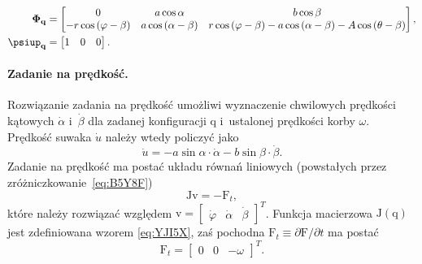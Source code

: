 \documentclass[paper=a4,DIV=12]{tmmlab}
\newcommand{\brm}[1]{\bm{\mathrm{#1}}}
\begin{document}
\begin{appendices}
  \begin{subequations}
    \label{eq:JSBPA}
    \begin{align}
    \brm{\Phi}_{\brm{q}}& = \begin{bmatrix}
      0 &
      a \cos{\alpha} &
      b \cos{\beta}
      \\
     -r \cos{(\varphi - \beta)} &
      a \cos{(\alpha - \beta)} &
      r \cos{(\varphi - \beta)} - a \cos{(\alpha - \beta)} - A \cos{(\theta - \beta)}
    \end{bmatrix},
    \\
    \boldsymbol{\psiup}_{\brm{q}} & = \begin{bmatrix}
      1 & 0 & 0
    \end{bmatrix}.
    \end{align}
  \end{subequations}

  \paragraph{Zadanie na prędkość.} Rozwiązanie zadania na prędkość umożliwi
  wyznaczenie chwilowych prędkości kątowych $\dot \alpha$ i~$\dot \beta$ dla
  zadanej konfiguracji $\brm{q}$ i~ustalonej prędkości korby $\omega$.
  Prędkość suwaka $\dot u$ należy wtedy policzyć jako
  \begin{equation}
    {\dot u} = - a \sin{\alpha} \cdot {\dot \alpha} - b \sin{\beta} \cdot {\dot \beta}.
    \label{eq:Y3EXW}
  \end{equation}
  Zadanie na prędkość ma postać układu równań liniowych (powstałych przez
  zróżniczkowanie~\eqref{eq:B5Y8F})
  \begin{equation}
    \brm{J} \brm{v} = - \brm{F}_t,
    \label{eq:1103T}
  \end{equation}
  które należy rozwiązać względem $\brm{v} = \begin{bmatrix} {\dot \varphi}
  & {\dot \alpha} & {\dot \beta} \end{bmatrix}^T$. Funkcja macierzowa
  $\brm{J}\left(\brm{q}\right)$ jest zdefiniowana wzorem
  \eqref{eq:YJI5X}, zaś pochodna $\brm{F}_t \equiv
  {\partial{\brm{F}}}/{\partial {t}}$ ma postać
  \begin{equation}
    \brm{F}_t = \begin{bmatrix}
      0 & 0 & - \omega
    \end{bmatrix}^T.
    \label{eq:6KPI4}
  \end{equation}


\end{appendices}
\end{document}
